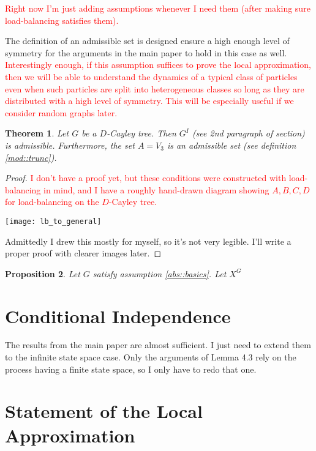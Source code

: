 \documentclass[12pt]{article}
\newcommand{\tr}{\textcolor{red}}
\renewcommand{\d}{D}
\newcommand{\inter}[1]{#1^I}
\newtheorem{thms}{Theorem}[section]
\newtheorem{prop}[thms]{Proposition}
\begin{document}
\tr{Right now I'm just adding assumptions whenever I need them (after making sure load-balancing satisfies them).}

The definition of an admissible set is designed ensure a high enough level of symmetry for the arguments in the main paper to hold in this case as well. \tr{Interestingly enough, if this assumption suffices to prove the local approximation, then we will be able to understand the dynamics of a typical class of particles even when such particles are split into heterogeneous classes so long as they are distributed with a high level of symmetry. This will be especially useful if we consider random graphs later.}

\begin{thms}
Let \(G\) be a \(\d\)-Cayley tree. Then \(\inter{G}\) (see 2nd paragraph of section\iffalse \ref{mod} \fi) is admissible. Furthermore, the set \(A = V_3\) is an admissible set (see definition \ref{mod::trunc}).
\end{thms}
\begin{proof}
\tr{I don't have a proof yet, but these conditions were constructed with load-balancing in mind, and I have a roughly hand-drawn diagram showing \(A,B,C,D\) for load-balancing on the \(\d\)-Cayley tree.}

\texttt{[image: lb\_to\_general]}

Admittedly I drew this mostly for myself, so it's not very legible. I'll write a proper proof with clearer images later.
\end{proof}

\begin{prop}
Let \(G\) satisfy assumption \ref{abs::basics}. Let \(X^G\)
\end{prop}


\section{Conditional Independence}
\label{CI}

The results from the main paper are almost sufficient. I just need to extend them to the infinite state space case. Only the arguments of Lemma 4.3 rely on the process having a finite state space, so I only have to redo that one.

\section{Statement of the Local Approximation}
\label{Main}
\end{document}

